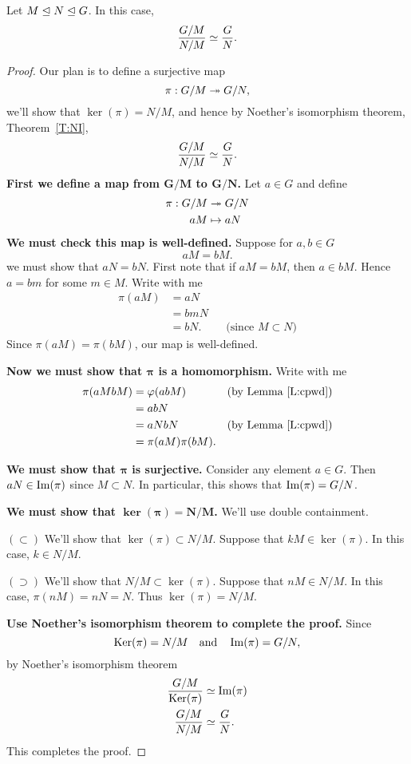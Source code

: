 \documentclass{ximera}
\begin{document}
\begin{theorem}
  Let $M\normal N\normal G$. In this case,
  \[
  \frac{G/M}{N/M} \iso \frac{G}{N}.
  \]
  \begin{proof}
    Our plan is to define a surjective map
    \[
    \pi:G/M \onto G/N,
    \]
    we'll show that $\ker(\pi) = N/M$, and hence by Noether's
    isomorphism theorem, Theorem~\ref{T:NI},
    \[
    \frac{G/M}{N/M} \iso \frac{G}{N}.
    \]
    \textbf{First we define a map from $\boldsymbol{G/M}$ to
      $\boldsymbol{G/N}$.} Let $a\in G$ and define
    \begin{align*}
      \pi: G/M &\onto G/N \\
      aM &\mapsto aN
    \end{align*}
    \textbf{We must check this map is
      well-defined.} Suppose for $a,b\in G$
    \[
    a M = bM.
    \]
    we must show that $aN = bN$. First note that if $aM = bM$, then $a
    \in bM$. Hence $a=bm$ for some $m\in M$. Write with me
    \begin{align*}
      \pi(aM) &= aN\\
      &= bm N\\
      &= bN.  & &\text{(since $M\subset N$)}
    \end{align*}
    Since $\pi(a M) = \pi(bM)$, our map is well-defined.

    \textbf{Now we must show that $\boldsymbol\pi$ is a homomorphism.}
    Write with me
    \begin{align*}
      \pi(aMbM) &= \phi(ab M) & &\text{(by  Lemma~\ref{L:cpwd})} \\
      &= ab N \\
      &= aN bN & &\text{(by  Lemma~\ref{L:cpwd})} \\
      &= \pi(aM)\pi(bM).
    \end{align*}


    \textbf{We must show that $\boldsymbol{\pi}$ is surjective.}
    Consider any element $a\in G$. Then $aN\in \im(\pi)$ since
    $M\subset N$. In particular, this shows that $\im(\pi) = G/N$.

    
    \textbf{We must show that $\boldsymbol{\ker(\pi)=N/M}$.} We'll use
    double containment.

    $(\subset)$ We'll show that $\ker(\pi)\subset N/M$.  Suppose that
    $kM\in\ker(\pi)$. In this case, $k\in N/M$.
    

    $(\supset)$ We'll show that $N/M\subset \ker(\pi)$. Suppose that
    $nM\in N/M$. In this case, $\pi(nM) = nN = N$. Thus
    $\ker(\pi)=N/M$.


    \textbf{Use Noether's isomorphism theorem to complete the proof.} Since
    \[
    \ker(\pi) = N/M\quad\text{and}\quad\im(\pi) = G/N,
    \]
    by Noether's isomorphism theorem
    \begin{align*}
    \frac{G/M}{\ker(\pi)} &\iso \im(\pi)\\
    \frac{G/M}{N/M} &\iso \frac{G}{N}.
    \end{align*}
    This completes the proof.
  \end{proof}
\end{theorem}
\end{document}
